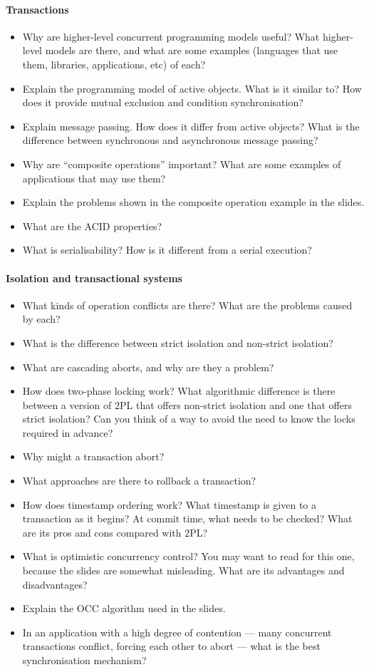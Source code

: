 \documentclass[12pt,a4paper,oneside,openright]{report}
\newcommand{\question}[2]{\paragraph{#1} #2}
\begin{document}
\question{Transactions}{
  \begin{itemize}
  \item Why are higher-level concurrent programming models useful?
    What higher-level models are there, and what are some examples
    (languages that use them, libraries, applications, etc) of each?
  \item Explain the programming model of active objects. What is it
    similar to? How does it provide mutual exclusion and condition
    synchronisation?
  \item Explain message passing. How does it differ from active
    objects? What is the difference between synchronous and
    asynchronous message passing?
  \item Why are ``composite operations'' important? What are some
    examples of applications that may use them?
  \item Explain the problems shown in the composite operation example
    in the slides.
  \item What are the ACID properties?
  \item What is serialisability? How is it different from a serial
    execution?
  \end{itemize}
}

\question{Isolation and transactional systems}{
  \begin{itemize}
  \item What kinds of operation conflicts are there? What are the
    problems caused by each?
  \item What is the difference between strict isolation and non-strict
    isolation?
  \item What are cascading aborts, and why are they a problem?
  \item How does two-phase locking work? What algorithmic difference
    is there between a version of 2PL that offers non-strict isolation
    and one that offers strict isolation? Can you think of a way to
    avoid the need to know the locks required in advance?
  \item Why might a transaction abort?
  \item What approaches are there to rollback a transaction?
  \item How does timestamp ordering work? What timestamp is given to a
    transaction as it begins? At commit time, what needs to be
    checked? What are its pros and cons compared with 2PL?
  \item What is optimistic concurrency control? You may want to read
    \cite[Chapter~20.6]{bacon2003operating} for this one, because the
    slides are somewhat misleading. What are its advantages and
    disadvantages?
  \item Explain the OCC algorithm used in the slides.
  \item In an application with a high degree of contention --- many
    concurrent transactions conflict, forcing each other to abort ---
    what is the best synchronisation mechanism?
  \end{itemize}
}
\end{document}
